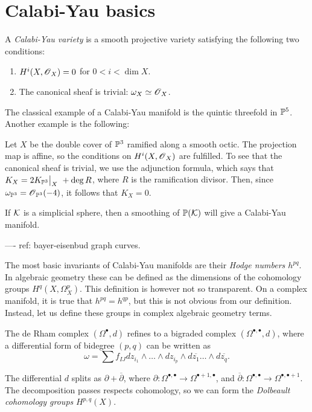 \documentclass[]{uiophd}
\begin{document}
\section{Calabi-Yau basics}

\begin{defi}
A \emph{Calabi-Yau variety} is a smooth projective variety satisfying the following two conditions:
\begin{enumerate}
	\item $H^i(X,\operatorname{\mathscr{O}}_X)=0$ for $0 < i < \dim X$.
	\item The canonical sheaf is trivial: $\omega_X \simeq \operatorname{\mathscr{O}}_X$. 
\end{enumerate}
\end{defi}

The classical example of a Calabi-Yau manifold is the quintic threefold in $\mathbb{P}^5$. Another example is the following:

\begin{example}
Let $X$ be the double cover of $\mathbb{P}^3$ ramified along a smooth octic. The projection map is affine, so the conditions on $H^i(X,\operatorname{\mathscr{O}}_X)$ are fulfilled. To see that the canonical sheaf is trivial, we use the adjunction formula, which says that $K_X= 2 \restr{K_{\PP^3}}{X} + \deg R$, where $R$ is the ramification divisor. Then, since $\omega_{\mathbb{P}^3}=\operatorname{\mathscr{O}}_{\mathbb{P}^3}(-4)$, it follows that $K_X=0$.
\end{example}

If $\mathcal K$ is a simplicial sphere, then a smoothing of $\mathbb{P}(\mathcal K)$ will give a Calabi-Yau manifold.


---- ref: bayer-eisenbud graph curves.

The most basic invariants of Calabi-Yau manifolds are their \emph{Hodge numbers $h^{pq}$}. In algebraic geometry these can be defined as the dimensions of the cohomology groups $H^q(X,\Omega^p_X)$. This definition is however not so transparent. On a complex manifold, it is true that $h^{pq}=h^{qp}$, but this is not obvious from our definition. Instead, let us define these groups in complex algebraic geometry terms.

The de Rham complex $(\Omega^\bullet,d)$ refines to a bigraded complex $(\Omega^{\bullet,\bullet},d)$, where a differential form of bidegree $(p,q)$ can be written as 
$$
\omega = \sum {f_{IJ}} dz_{i_1} \wedge \ldots \wedge dz_{i_p} \wedge d\overline{z_1}\ldots \wedge d\overline{z_q}.
$$

The differential $d$ splits as $\partial + \overline \partial$, where $\partial: \Omega^{\bullet,\bullet} \to \Omega^{\bullet+1,\bullet}$, and $\overline \partial: \Omega^{\bullet,\bullet} \to \Omega^{\bullet,\bullet+1}$. The decomposition passes respects cohomology, so we can form the \emph{Dolbeault cohomology groups} $H^{p,q}(X)$. 
\end{document}
